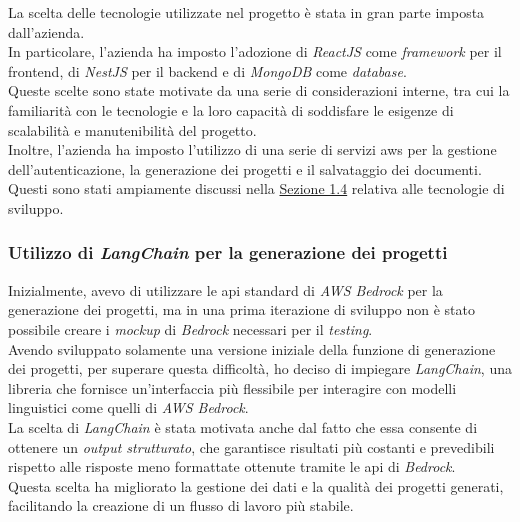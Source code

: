 La scelta delle tecnologie utilizzate nel progetto è stata in gran parte imposta dall'azienda.\\
In particolare, l'azienda ha imposto l'adozione di \textit{ReactJS} come \textit{framework} per il \gls{frontend}, di \textit{NestJS} per il \gls{backend} e di \textit{MongoDB} come \textit{database}.\\
Queste scelte sono state motivate da una serie di considerazioni interne, tra cui la familiarità con le tecnologie e la loro capacità di soddisfare le esigenze di scalabilità e manutenibilità del progetto.\\

\noindent Inoltre, l'azienda ha imposto l'utilizzo di una serie di servizi \gls{aws} per la gestione dell'autenticazione, la generazione dei progetti e il salvataggio dei documenti.\\
Questi sono stati ampiamente discussi nella {\hyperref[sez:tecnologie-sviluppo]{Sezione 1.4}} relativa alle tecnologie di sviluppo.

\subsubsection{Utilizzo di \textit{LangChain} per la generazione dei progetti}

Inizialmente, avevo di utilizzare le \gls{api} standard di \textit{AWS Bedrock} per la generazione dei progetti, ma in una prima iterazione di sviluppo non è stato possibile creare i \textit{mockup} di \textit{Bedrock} necessari per il \textit{testing}.\\

\noindent Avendo sviluppato solamente una versione iniziale della funzione di generazione dei progetti, per superare questa difficoltà, ho deciso di impiegare \textit{LangChain}, una libreria che fornisce un'interfaccia più flessibile per interagire con modelli linguistici come quelli di \textit{AWS Bedrock}.\\

\noindent La scelta di \textit{LangChain} è stata motivata anche dal fatto che essa consente di ottenere un \textit{output strutturato}, che garantisce risultati più costanti e prevedibili rispetto alle risposte meno formattate ottenute tramite le \gls{api} di \textit{Bedrock}.\\

\noindent Questa scelta ha migliorato la gestione dei dati e la qualità dei progetti generati, facilitando la creazione di un flusso di lavoro più stabile.

